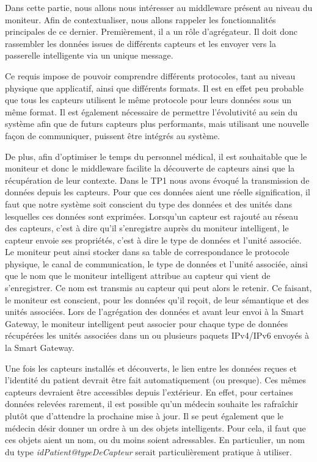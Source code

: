 Dans cette partie, nous allons nous intéresser au middleware présent au niveau du moniteur. Afin de contextualiser, nous allons
rappeler les fonctionnalités principales de ce dernier. Premièrement, il a un rôle d'agrégateur. Il doit donc rassembler les
données issues de différents capteurs et les envoyer vers la passerelle intelligente via un unique message. 
\newline

Ce requis impose de pouvoir comprendre différents protocoles, tant au niveau physique que applicatif, ainsi que différents
formats. Il est en effet peu probable que tous les capteurs utilisent le même protocole pour leurs données sous un même format. Il
est également nécessaire de permettre l'évolutivité au sein du système afin que de futurs capteurs plus performants, mais
utilisant une nouvelle façon de communiquer, puissent être intégrés au système.
\newline

De plus, afin d'optimiser le temps du personnel médical, il est souhaitable que le moniteur et donc le middleware facilite la
découverte de capteurs ainsi que la récupération de leur contexte. Dans le TP1 nous avons évoqué la transmission de données depuis les capteurs. Pour que ces données aient une réelle signification, il faut que notre système soit conscient du type des données et des unités dans lesquelles ces données sont exprimées. Lorsqu’un capteur est rajouté au réseau des capteurs, c’est à dire qu’il s’enregistre auprès du moniteur intelligent, le capteur envoie ses propriétés, c’est à dire le type de données et l’unité associée. Le moniteur peut ainsi stocker dans sa table de correspondance le protocole physique, le canal de communication, le type de données et l’unité associée, ainsi que le nom que le moniteur intelligent attribue au capteur qui vient de s’enregistrer. Ce nom est transmis au capteur qui peut alors le retenir. Ce faisant, le moniteur est conscient, pour les données qu’il reçoit, de leur sémantique et des unités associées. Lors de l’agrégation des données et avant leur envoi à la Smart Gateway, le moniteur intelligent peut associer pour chaque type de données récupérées les unités associées dans un ou plusieurs paquets IPv4/IPv6 envoyés à la Smart Gateway.
\newline

Une fois les capteurs installés et découverts, le lien entre les données
reçues et l'identité du patient devrait être fait automatiquement (ou presque). Ces mêmes capteurs devraient être accessibles
depuis l'extérieur. En effet, pour certaines données relevées rarement, il est possible qu'un médecin souhaite les rafraîchir
plutôt que d'attendre la prochaine mise à jour. Il se peut également que le médecin désir donner un ordre à un des objets
intelligents. Pour cela, il faut que ces objets aient un nom, ou du moins soient adressables. En particulier, un nom du type
\textit{idPatient@typeDeCapteur} serait particulièrement pratique à utiliser.
\newline

